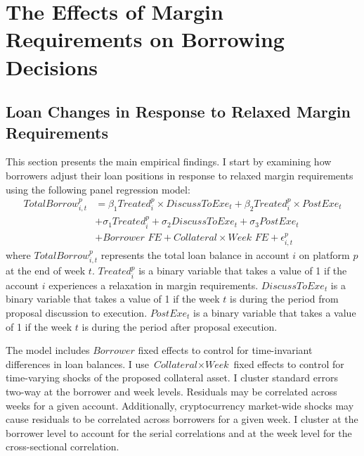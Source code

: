 \documentclass[12pt]{article}
\begin{document}
\section{The Effects of Margin Requirements on Borrowing Decisions}\label{sec:main}

\subsection{Loan Changes in Response to Relaxed Margin Requirements}
This section presents the main empirical findings. I start by examining how borrowers adjust their loan positions in response to relaxed margin requirements using the following panel regression model:
\begin{align}
    \nonumber TotalBorrow_{i,t}^{p} &= \beta_1Treated_{i}^{p}\times DiscussToExe_t + \beta_2Treated^{p}_{i}\times PostExe_{t}\\\nonumber &+ \sigma_1Treated^p_{i} + \sigma_2 DiscussToExe_t+\sigma_3 PostExe_{t}\\ &+\textit{Borrower FE} + \textit{Collateral}\times\textit{Week FE}+\epsilon_{i,t}^p\label{eq:main}
\end{align}
where $TotalBorrow_{i,t}^{p}$ represents the total loan balance in account $i$ on platform $p$ at the end of week $t$. $Treated_{i}^{p}$ is a binary variable that takes a value of 1 if the account $i$ experiences a relaxation in margin requirements. $DiscussToExe_t$ is a binary variable that takes a value of 1 if the week $t$ is during the period from proposal discussion to execution. $PostExe_t$ is a binary variable that takes a value of 1 if the week $t$ is during the period after proposal execution.

The model includes $\textit{Borrower}$ fixed effects to control for time-invariant differences in loan balances. I use $\textit{Collateral}\times\textit{Week}$ fixed effects to control for time-varying shocks of the proposed collateral asset. I cluster standard errors two-way at the borrower and week levels. Residuals may be correlated across weeks for a given account. Additionally, cryptocurrency market-wide shocks may cause residuals to be correlated across borrowers for a given week. I cluster at the borrower level to account for the serial correlations and at the week level for the cross-sectional correlation. 
\end{document}

